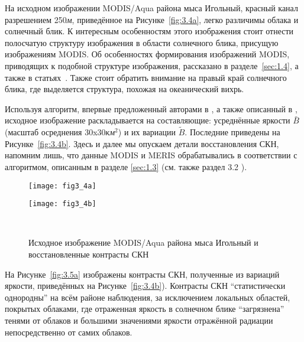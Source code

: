 На исходном изображении MODIS/Aqua района мыса Игольный, красный канал разрешением 250\textit{м}, приведённое на Рисунке~\ref{fig:3.4a}, легко различимы облака и солнечный блик. К интересным особенностям этого изображения стоит отнести полосчатую структуру изображения в области солнечного блика, присущую изображениям MODIS. Об особенностях формирования изображений MODIS, приводящих к подобной структуре изображения, рассказано в разделе~\ref{sec:1.4}, а также в статьях~\citep{Myasoedov2010a, Myasoedov2010}. Также стоит обратить внимание на правый край солнечного блика, где выделяется структура, похожая на океанический вихрь.

Используя алгоритм, впервые предложенный авторами в \citep{Kudryavtsev2010,Myasoedov2010a}, а также описанный в \citep{Myasoedov2010}, исходное изображение раскладывается на составляющие: усреднённые яркости $\bar{B}$ (масштаб осреднения 30x30\textit{км${}^2$}) и их вариации $\tilde{B}$. Последние приведены на Рисунке~\ref{fig:3.4b}. Здесь и далее мы опускаем детали восстановления СКН, напомним лишь, что данные MODIS и MERIS обрабатывались в соответствии с алгоритмом, описанным в разделе \ref{sec:1.3} (см. также раздел 3.2 \citep{Myasoedov2010}).



\begin{figure}[H]
   	\centering
	\begin{minipage}{.47\textwidth}
	    \subcaptionbox{\label{fig:3.4a}}
		{\texttt{[image: fig3\_4a]}}
	\end{minipage}
	\hfill
	\begin{minipage}{.47\textwidth}
	    \subcaptionbox{\label{fig:3.4b}}
		{\texttt{[image: fig3\_4b]}}
	\end{minipage}
    \\
    \caption{Исходное изображение MODIS/Aqua района мыса Игольный и восстановленные контрасты СКН}
    \label{fig:3.4}
\end{figure}


На Рисунке~\ref{fig:3.5a} изображены контрасты СКН, полученные из вариаций яркости, приведённых на Рисунке~\ref{fig:3.4b}). Контрасты СКН ``статистически однородны'' на всём районе наблюдения, за исключением локальных областей, покрытых облаками, где отраженная яркость в солнечном блике ``загрязнена'' тенями от облаков и большими значениями яркости отражённой радиации непосредственно от самих облаков. 

